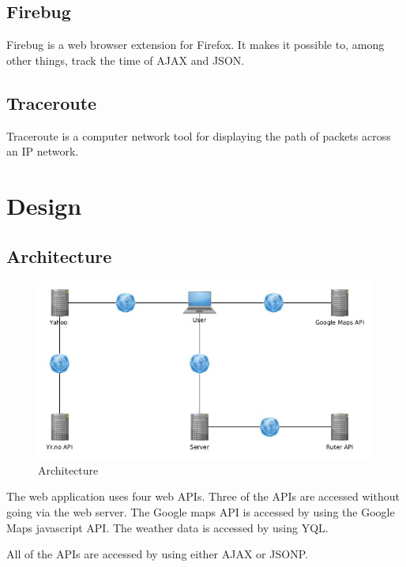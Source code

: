 \documentclass[10pt,a4paper]{article}
\begin{document}
\subsection{Firebug}
Firebug is a web browser extension for Firefox. It makes it possible to, among other things, track the time of AJAX and JSON.

\subsection{Traceroute}
Traceroute is a computer network tool for displaying the path of packets across an IP network.
\section{Design}

\subsection{Architecture}
\label{sec:architecture}



\begin{figure}
\centering
\includegraphics[width=\textwidth]{../arch/arch}
\caption{Architecture}
\label{fig:arch}
\end{figure}
The web application uses four web APIs. Three of the APIs are accessed without going via the web server. The Google maps API is accessed by using the Google Maps javascript API. The weather data is accessed by using YQL. 

All of the APIs are accessed by using either AJAX or JSONP.
\end{document}
